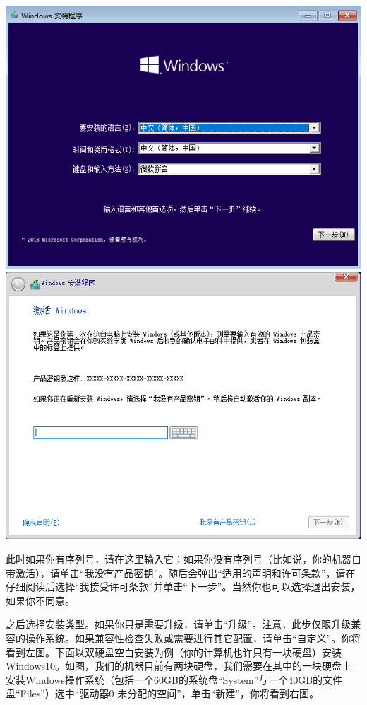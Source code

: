 \begin{center}
	\includegraphics[scale=0.5]{pic/win10setup2}\\	\includegraphics[scale=0.5]{pic/win10setup3}
\end{center} \par
此时如果你有序列号，请在这里输入它；如果你没有序列号（比如说，你的机器自带激活），请单击“我没有产品密钥”。随后会弹出“适用的声明和许可条款”，请在{\color{red}仔细阅读}后选择“我接受许可条款”并单击“下一步”。当然你也可以选择退出安装，如果你不同意。\par
之后选择安装类型。如果你只是需要升级，请单击“升级”。注意，此步仅限升级兼容的操作系统。如果兼容性检查失败或需要进行其它配置，请单击“自定义”。你将看到左图。下面以双硬盘空白安装为例（你的计算机也许只有一块硬盘）安装Windows10。如图，我们的机器目前有两块硬盘，我们需要在其中的一块硬盘上安装Windows操作系统（包括一个60GB的系统盘“System”与一个40GB的文件盘“Files”）选中“驱动器0 未分配的空间”，单击“新建”，你将看到右图。
